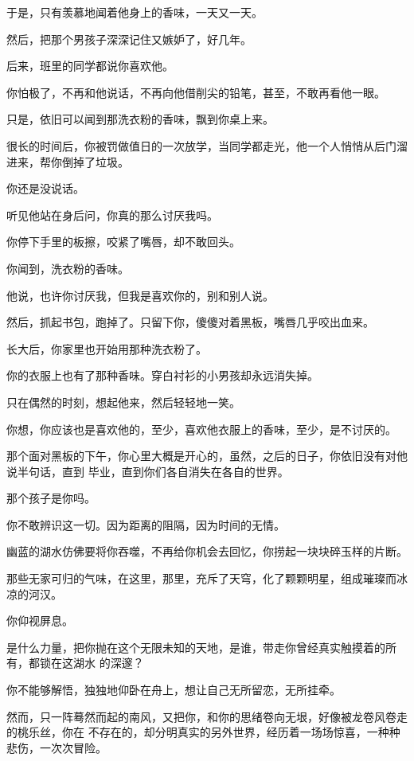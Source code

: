 		于是，只有羡慕地闻着他身上的香味，一天又一天。\par
		然后，把那个男孩子深深记住又嫉妒了，好几年。


		后来，班里的同学都说你喜欢他。\par
		你怕极了，不再和他说话，不再向他借削尖的铅笔，甚至，不敢再看他一眼。\par
		只是，依旧可以闻到那洗衣粉的香味，飘到你桌上来。\par
		很长的时间后，你被罚做值日的一次放学，当同学都走光，他一个人悄悄从后门溜进来，帮你倒掉了垃圾。

		你还是没说话。\par
		听见他站在身后问，你真的那么讨厌我吗。\par
		你停下手里的板擦，咬紧了嘴唇，却不敢回头。\par
		你闻到，洗衣粉的香味。\par
		他说，也许你讨厌我，但我是喜欢你的，别和别人说。\par
		然后，抓起书包，跑掉了。只留下你，傻傻对着黑板，嘴唇几乎咬出血来。


		长大后，你家里也开始用那种洗衣粉了。\par
		你的衣服上也有了那种香味。穿白衬衫的小男孩却永远消失掉。\par
		只在偶然的时刻，想起他来，然后轻轻地一笑。\par
		你想，你应该也是喜欢他的，至少，喜欢他衣服上的香味，至少，是不讨厌的。

		那个面对黑板的下午，你心里大概是开心的，虽然，之后的日子，你依旧没有对他说半句话，直到
	毕业，直到你们各自消失在各自的世界。


		\vspace{1em}
		那个孩子是你吗。\par
		你不敢辨识这一切。因为距离的阻隔，因为时间的无情。\par
		幽蓝的湖水仿佛要将你吞噬，不再给你机会去回忆，你捞起一块块碎玉样的片断。\par
		那些无家可归的气味，在这里，那里，充斥了天穹，化了颗颗明星，组成璀璨而冰凉的河汉。\par
		你仰视屏息。

		是什么力量，把你抛在这个无限未知的天地，是谁，带走你曾经真实触摸着的所有，都锁在这湖水
	的深邃？

		你不能够解悟，独独地仰卧在舟上，想让自己无所留恋，无所挂牵。

		然而，只一阵蓦然而起的南风，又把你，和你的思绪卷向无垠，好像被龙卷风卷走的桃乐丝，你在
	不存在的，却分明真实的另外世界，经历着一场场惊喜，一种种悲伤，一次次冒险。


